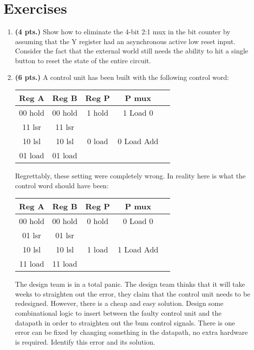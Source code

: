 \section{Exercises}
\label{section:datapathControl}
\graphicspath{ {./chapter08/FigHw} }

\begin{enumerate}
\item \textbf{ (4 pts.)}
Show how to eliminate the 4-bit 2:1 mux in the bit counter by
assuming that the Y register had an asynchronous active low reset input.
Consider the fact that the external world still needs the ability to hit
a single button to reset the state of the entire circuit. 

\item  \textbf{ (6 pts.)}
A control unit has been built with the following control word:

\begin{tabular}{|c|c|c|c|c|}  \hline
Reg A       & Reg B         &  Reg P        & P mux         \\ \hline
00 hold     & 00 hold       &  1 hold       & 1 Load 0      \\ \hline
11 lsr      & 11 lsr        &               &               \\ \hline
10 lsl      & 10 lsl        &  0 load       & 0 Load Add    \\ \hline
01 load     & 01 load       &               &               \\ \hline 
\end{tabular}

Regrettably, these setting were completely wrong.  In reality here is what the control word should
have been:

\begin{tabular}{|c|c|c|c|c|}  \hline
Reg A       & Reg B         &  Reg P        & P mux         \\ \hline
00 hold     & 00 hold       &  0 hold       & 0 Load 0      \\ \hline
01 lsr      & 01 lsr        &               &               \\ \hline
10 lsl      & 10 lsl        &  1 load       & 1 Load Add    \\ \hline
11 load     & 11 load       &               &               \\ \hline 
\end{tabular}

The design team is in a total panic.
The design team thinks that it will take weeks to straighten out the error, 
they claim that the control unit needs to be redesigned.  However, there is
a cheap and easy solution.  Design some combinational 
logic to insert between the faulty control unit and the datapath in order
to straighten out the bum control signals.  There is one error can be 
fixed by changing something in the datapath, no extra hardware is 
required.  Identify this error and its solution.


\end{enumerate}

